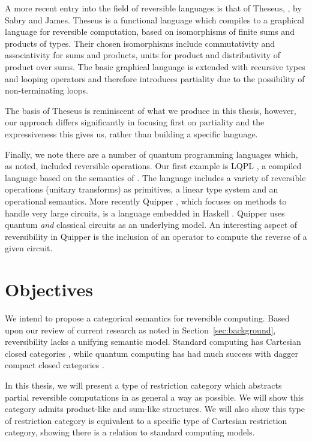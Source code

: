 A more recent entry into the field of reversible languages is that of Theseus,
\cite{james2014theseus}, by Sabry and James. Theseus is a functional language which compiles to
a graphical language \cite{james2013isomorphic,james2012information} for reversible computation, based on
isomorphisms of finite sums and products of types. Their chosen isomorphisms include commutativity
and associativity for sums and products, units for product and distributivity of product over
sums. The basic graphical language is extended with recursive types and looping operators and
therefore introduces partiality due to the possibility of non-terminating loops.

The basis of Theseus is reminiscent of what we produce in this thesis, however, our approach differs
significantly in focusing first on partiality and the expressiveness this gives us, rather than
building a specific language.


Finally, we note there are a number of quantum programming languages which, as noted, included
reversible operations. Our first example is LQPL \cite{giles2007}, a compiled language based on the
semantics of \cite{selinger04:qpl}. The language includes a variety of reversible operations
(unitary transforms) as primitives, a linear type system and an operational semantics. More recently
Quipper \cite{green2013introduction,green2013quipper}, which focuses on methods to handle very large
circuits, is a language embedded in Haskell \cite{peyton2003:haskell98}. Quipper uses quantum
\emph{and} classical circuits as an underlying model. An interesting aspect of reversibility in
Quipper is the inclusion of an operator to compute the reverse of a given circuit.

\section{Objectives}
\label{sec:objectives}

We intend to propose a categorical semantics for reversible computing. Based upon our review of
current research as noted in Section~\ref{sec:background}, reversibility lacks a unifying semantic
model. Standard computing has Cartesian closed categories \cite{barr:ctcs}, while quantum computing
has had much success with dagger compact closed categories
\cite{selinger04:towardssemantics,selinger05:dagger,abramsky05:abstractscalars}.

In this thesis, we will present a type of restriction category which abstracts partial reversible
computations in as general a way as possible. We will show this category admits product-like and
sum-like structures. We will also show this type of restriction category is equivalent to a specific
type of Cartesian restriction category, showing there is a relation to standard computing models.

